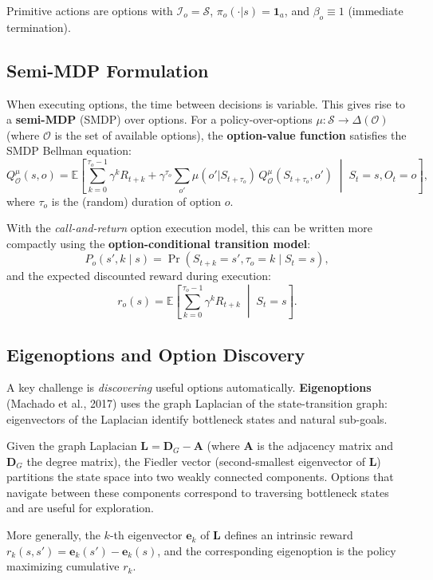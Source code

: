 \documentclass[11pt,a4paper]{article}
\newcommand{\E}{\mathbb{E}}
\newcommand{\cS}{\mathcal{S}}
\newcommand{\cO}{\mathcal{O}}
\newcommand{\cI}{\mathcal{I}}
\begin{document}
Primitive actions are options with $\cI_o = \cS$, $\pi_o(\cdot|s) = \mathbf{1}_a$,
and $\beta_o \equiv 1$ (immediate termination).

\subsection{Semi-MDP Formulation}

When executing options, the time between decisions is variable. This gives
rise to a \textbf{semi-MDP} (SMDP) over options. For a policy-over-options
$\mu : \cS \to \Delta(\cO)$ (where $\cO$ is the set of available options),
the \textbf{option-value function} satisfies the SMDP Bellman equation:
\begin{equation}
  Q_\cO^\mu(s, o) = \E\!\left[\sum_{k=0}^{\tau_o - 1} \gamma^k R_{t+k} + \gamma^{\tau_o}
  \sum_{o'} \mu(o' | S_{t+\tau_o})\, Q_\cO^\mu(S_{t+\tau_o}, o') \;\middle|\; S_t = s, O_t = o \right],
  \label{eq:option-bellman}
\end{equation}
where $\tau_o$ is the (random) duration of option $o$.

With the \emph{call-and-return} option execution model, this can be written
more compactly using the \textbf{option-conditional transition model}:
\[
  P_o(s', k \mid s) = \Pr(S_{t+k} = s', \tau_o = k \mid S_t = s),
\]
and the expected discounted reward during execution:
\[
  r_o(s) = \E\!\left[\sum_{k=0}^{\tau_o - 1} \gamma^k R_{t+k} \;\middle|\; S_t = s \right].
\]

\subsection{Eigenoptions and Option Discovery}

A key challenge is \emph{discovering} useful options automatically.
\textbf{Eigenoptions} (Machado et al., 2017) uses the graph Laplacian of the
state-transition graph: eigenvectors of the Laplacian identify bottleneck
states and natural sub-goals.

Given the graph Laplacian $\mathbf{L} = \mathbf{D}_G - \mathbf{A}$ (where $\mathbf{A}$ is the adjacency
matrix and $\mathbf{D}_G$ the degree matrix), the Fiedler vector (second-smallest
eigenvector of $\mathbf{L}$) partitions the state space into two weakly connected
components. Options that navigate between these components correspond to
traversing bottleneck states and are useful for exploration.

More generally, the $k$-th eigenvector $\mathbf{e}_k$ of $\mathbf{L}$ defines an intrinsic
reward $r_k(s, s') = \mathbf{e}_k(s') - \mathbf{e}_k(s)$, and the corresponding eigenoption
is the policy maximizing cumulative $r_k$.
\end{document}
